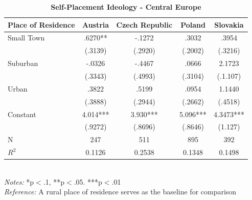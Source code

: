\documentclass[12pt, titlepage]{article}
\newcommand\e{\emph}
\newcommand\tb{\textbf}
\begin{document}
\begin{singlespace}
	\begin{table}[H]
		\centering
		\caption{\tb{Self-Placement Ideology - Central Europe}}
		\begin{tabulary}{\linewidth}{l c c c c}
			\\
			\hline
			\tb{Place of Residence} &\tb{Austria}&\tb{Czech Republic}& \tb{Poland} &\tb{Slovakia} \\
			\hline
			Small Town&.6270**& -.1272 & .3032 & .3954  \\
			&(.3139) & (.2920) & (.2002) & (.3216) \\
			Suburban&-.0326& -.4467&.0666 & 2.1723\\
			&(.3343)&(.4993) & (.3104) & (.1.107)\\
			Urban&.3822&.5199 & .0954 & 1.1440 \\
			&(.3888) &(.2944) & (.2662) & (.4518) \\
			Constant& 4.014***& 3.930***& 5.096*** & 4.3473***  \\
			&(.9272) & (.8696) & (.8646) & (1.127) \\
			N&247& 511& 895 & 392 \\
			$R^2$&0.1126&0.2538 & 0.1348 & 0.1498 \\
			\hline
		\end{tabulary}
		\\
		\e{Notes:} *p$<$.1, **p$<$.05. ***p$<$.01 \\
		\e{Reference:} A rural place of residence serves as the baseline for comparison
		\label{table6}
	\end{table}
\end{singlespace}
\end{document}
